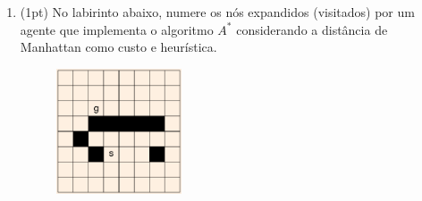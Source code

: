 \documentclass{article}
\begin{document}
\begin{enumerate}
\begin{enumerate}
            \vspace{2cm}
            
            \item (1pt) No labirinto abaixo, numere os nós expandidos (visitados) por um agente que implementa o algoritmo $A^*$ considerando a distância de Manhattan como custo e heurística.
            \begin{figure}[!ht]
                \centering
                \includegraphics[width=0.35\textwidth]{grid.png}
            \end{figure}
            
        \end{enumerate}

\end{enumerate}






\end{document}
